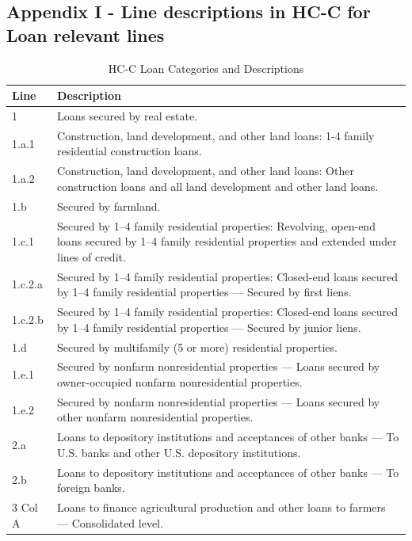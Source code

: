 \documentclass[conference]{IEEEtran}
\begin{document}
\subsection{Appendix I - Line descriptions in HC-C for Loan relevant lines}
\begin{table}[htbp]
	\centering
	\caption{HC-C Loan Categories and Descriptions}
	\begin{tabular}{|p{3cm}|p{12cm}|}
		\hline
		\textbf{Line} & \textbf{Description} \\
		\hline
		1 & Loans secured by real estate. \\
		\hline
		1.a.1 & Construction, land development, and other land loans: 1-4 family residential construction loans. \\
		\hline
		1.a.2 & Construction, land development, and other land loans: Other construction loans and all land development and other land loans. \\
		\hline
		1.b & Secured by farmland. \\
		\hline
		1.c.1 & Secured by 1–4 family residential properties: Revolving, open-end loans secured by 1–4 family residential properties and extended under lines of credit. \\
		\hline
		1.c.2.a & Secured by 1–4 family residential properties: Closed-end loans secured by 1–4 family residential properties — Secured by first liens. \\
		\hline
		1.c.2.b & Secured by 1–4 family residential properties: Closed-end loans secured by 1–4 family residential properties — Secured by junior liens. \\
		\hline
		1.d & Secured by multifamily (5 or more) residential properties. \\
		\hline
		1.e.1 & Secured by nonfarm nonresidential properties — Loans secured by owner-occupied nonfarm nonresidential properties. \\
		\hline
		1.e.2 & Secured by nonfarm nonresidential properties — Loans secured by other nonfarm nonresidential properties. \\
		\hline
		2.a & Loans to depository institutions and acceptances of other banks — To U.S. banks and other U.S. depository institutions. \\
		\hline
		2.b & Loans to depository institutions and acceptances of other banks — To foreign banks. \\
		\hline
		3 Col A & Loans to finance agricultural production and other loans to farmers — Consolidated level. \\
		\hline

\end{tabular}
\end{table}
\end{document}
